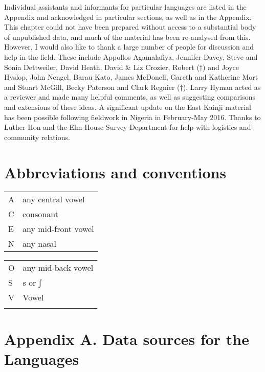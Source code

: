 \documentclass[output=paper]{langsci/langscibook}
\begin{document}
Individual assistants and informants for particular languages are listed in the Appendix and acknowledged in particular sections, as well as in the Appendix. This chapter could not have been prepared without access to a substantial body of unpublished data, and much of the material has been re-analysed from this. However, I would also like to thank a large number of people for discussion and help in the field. These include Appollos Agamalafiya, Jennifer Davey, Steve and Sonia Dettweiler, David Heath, David \& Liz Crozier, Robert (†) and Joyce Hyslop, John Nengel, Barau Kato, James McDonell, Gareth and Katherine Mort and Stuart McGill, Becky Paterson and Clark Regnier (†). Larry Hyman acted as a reviewer and made many helpful comments, as well as suggesting comparisons and extensions of these ideas. A significant update on the East Kainji material has been possible following fieldwork in Nigeria in February-May 2016. Thanks to Luther Hon and the Elm House Survey Department for help with logistics and community relations.

\section*{Abbreviations and conventions}

\begin{tabularx}{.45\textwidth}{lQ} 
A	& any central vowel\\
C	& consonant\\
E	& any mid-front vowel\\
N	& any nasal\\
\end{tabularx}
\begin{tabularx}{.45\textwidth}{lQ} 
O	& any mid-back vowel\\
S	& s or ʃ\\
V	& Vowel\\
\\
\end{tabularx}

   
\section*{Appendix A. Data sources for the  Languages}

\end{document}
